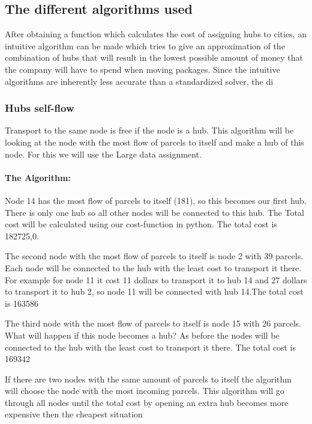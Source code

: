 \documentclass{article}
\begin{document}
        
    \subsection{The different algorithms used}
    
    After obtaining a function which calculates the cost of assigning hubs to cities, an intuitive algorithm can be made which tries to give an approximation of the combination of hubs that will result in the lowest possible amount of money that the company will have to spend when moving packages. 
    Since the intuitive algorithms are inherently less accurate than a standardized solver, the di
    
    
    
\subsubsection{Hubs self-flow}
Transport to the same node is free if the node is a hub. This algorithm will be looking at the node with the most flow of parcels to itself and make a hub of this node. For this we will use the Large data assignment.
\paragraph{The Algorithm:}
Node 14 has the most flow of parcels to itself (181), so this becomes our first hub. There is only one hub so all other nodes will be connected to this hub. The Total cost will be calculated using our cost-function in python.
The total cost is 182725,0.

The second node with the most flow of parcels to itself is node 2 with 39 parcels. Each node will be connected to the hub with the least cost to transport it there. For example for node 11 it cost 11 dollars to transport it to hub 14 and 27 dollars to transport it to hub 2, so node 11 will be connected with hub 14.The total cost is 163586

The third node with the most flow of parcels to itself is node 15 with 26 parcels. What will happen if this node becomes a hub? As before the nodes will be connected to the hub with the least cost to transport it there. The total cost is 169342
 
If there are two nodes with the same amount of parcels to itself the algorithm will choose the node with the most incoming parcels. This algorithm will go through all nodes until the total cost by opening an extra hub becomes more expensive then the cheapest situation
\end{document}
